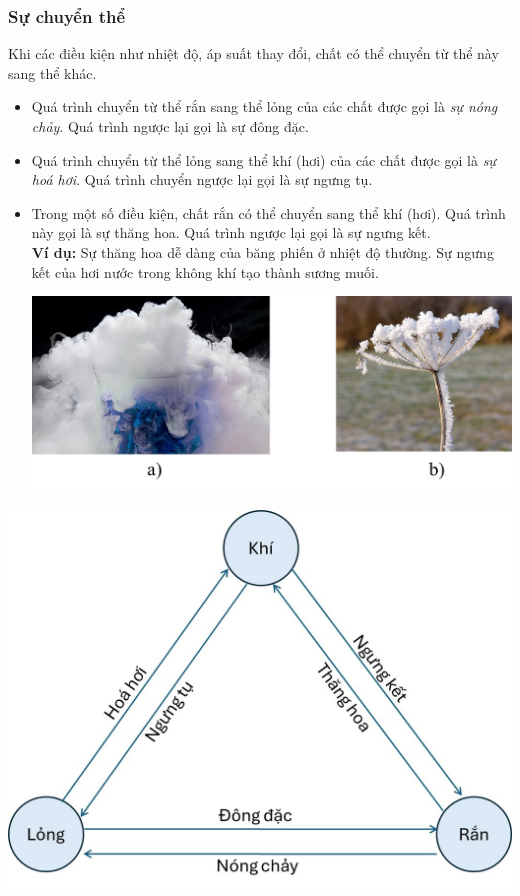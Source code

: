 \subsubsection{Sự chuyển thể}
Khi các điều kiện như nhiệt độ, áp suất thay đổi, chất có thể chuyển từ thể này sang thể khác.
\begin{itemize}
	\item Quá trình chuyển từ thể rắn sang thể lỏng của các chất được gọi là \textit{sự nóng chảy}. Quá trình ngược lại gọi là sự đông đặc.
	\item Quá trình chuyển từ thể lỏng sang thể khí (hơi) của các chất được gọi là \textit{sự hoá hơi}. Quá trình chuyển ngược lại gọi là sự ngưng tụ.
	\item Trong một số điều kiện, chất rắn có thể chuyển sang thể khí (hơi). Quá trình này gọi là sự thăng hoa. Quá trình ngược lại gọi là sự ngưng kết.\\
	\textbf{Ví dụ:} Sự thăng hoa dễ dàng của băng phiến ở nhiệt độ thường. Sự ngưng kết của hơi nước trong không khí tạo thành sương muối.
	\begin{center}
		\includegraphics[width=0.7\linewidth]{figs/VN12-Y24-PH-SYL-001-7}
	\end{center}
\end{itemize}
\begin{center}
	\includegraphics[width=0.5\linewidth]{figs/VN12-Y24-PH-SYL-001-4}
\end{center}
